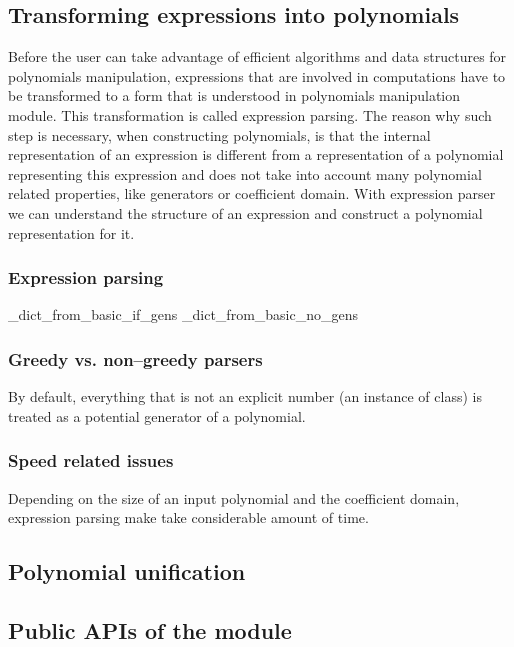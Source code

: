 \subsection{Transforming expressions into polynomials}

Before the user can take advantage of efficient algorithms and data structures for polynomials
manipulation, expressions that are involved in computations have to be transformed to a form
that is understood in polynomials manipulation module. This transformation is called expression
parsing. The reason why such step is necessary, when constructing polynomials, is that the
internal representation of an expression is different from a representation of a polynomial
representing this expression and does not take into account many polynomial related properties,
like generators or coefficient domain. With expression parser we can understand the structure
of an expression and construct a polynomial representation for it.


\subsubsection{Expression parsing}

\_dict\_from\_basic\_if\_gens
\_dict\_from\_basic\_no\_gens


\subsubsection{Greedy vs. non--greedy parsers}

By default, everything that is not an explicit number (an instance of  class) is
treated as a potential generator of a polynomial.


\subsubsection{Speed related issues}

Depending on the size of an input polynomial and the coefficient domain, expression parsing
make take considerable amount of time.


\subsection{Polynomial unification}


\subsection{Public APIs of the module}


